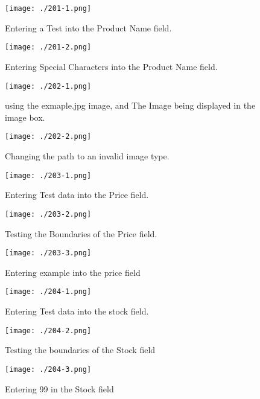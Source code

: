\begin{figure}[H]
    \texttt{[image: ./201-1.png]}
    \caption{Entering a Test into the Product Name field.} \label{fig:201-1}
\end{figure}

\begin{figure}[H]
    \texttt{[image: ./201-2.png]}
    \caption{Entering Special Characters into the Product Name field.} \label{fig:201-2}
\end{figure}

\begin{figure}[H]
    \texttt{[image: ./202-1.png]}
    \caption{using the exmaple.jpg image, and The Image being displayed in the image box.} \label{fig:202-1}
\end{figure}

\begin{figure}[H]
    \texttt{[image: ./202-2.png]}
    \caption{Changing the path to an invalid image type.} \label{fig:202-2}
\end{figure}

\begin{figure}[H]
    \texttt{[image: ./203-1.png]}
    \caption{Entering Test data into the Price field.} \label{fig:203-1}
\end{figure}

\begin{figure}[H]
    \texttt{[image: ./203-2.png]}
    \caption{Testing the Boundaries of the Price field.} \label{fig:203-2}
\end{figure}

\begin{figure}[H]
    \texttt{[image: ./203-3.png]}
    \caption{Entering example into the price field} \label{fig:203-3}
\end{figure}

\begin{figure}[H]
    \texttt{[image: ./204-1.png]}
    \caption{Entering Test data into the stock field.} \label{fig:204-1}
\end{figure}

\begin{figure}[H]
    \texttt{[image: ./204-2.png]}
    \caption{Testing the boundaries of the Stock field} \label{fig:204-2}
\end{figure}

\begin{figure}[H]
    \texttt{[image: ./204-3.png]}
    \caption{Entering 99 in the Stock field} \label{fig:204-3}
\end{figure}

